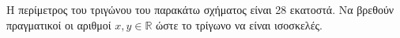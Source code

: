 Η περίμετρος του τριγώνου του παρακάτω σχήματος είναι 28 εκατοστά. Να βρεθούν πραγματικοί οι αριθμοί $ x, y\in\mathbb{R} $ ώστε το τρίγωνο να είναι ισοσκελές.
\vspace{-5mm}
\begin{center}
\end{center}